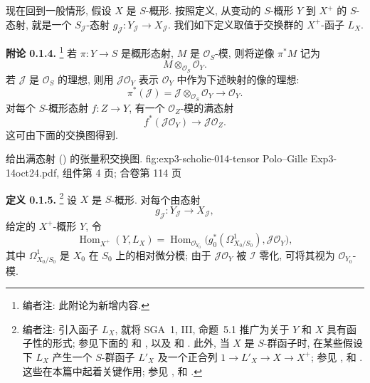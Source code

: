 现在回到一般情形, 假设 \(X\) 是 \(S\)-概形. 按照定义,
从变动的 \(S\)-概形 \(Y\) 到 \(X^+\) 的 \(S\)-态射,
就是一个 \(S_{\mathscr J}\)-态射
\(g_{\mathscr J}:Y_{\mathscr J}\to X_{\mathscr J}\).
我们如下定义取值于交换群的 \(X^+\)-函子 \(L_X\).

\medskip
\noindent{}\textbf{附论 0.1.4.}
\footnote{编者注: 此附论为新增内容.}
若 \(\pi:Y\to S\) 是概形态射, \(M\) 是 \(\mathscr O_S\)-模,
则将逆像 \(\pi^*M\) 记为
\[
 M\otimes_{\mathscr O_S}\mathscr O_Y.
\]
若 \(\mathscr J\) 是 \(\mathscr O_S\) 的理想, 则用
\(\mathscr J\mathscr O_Y\) 表示 \(\mathscr O_Y\) 中作为下述映射的像的理想:
\[
 \pi^*(\mathscr J)
 =\mathscr J\otimes_{\mathscr O_S}\mathscr O_Y
 \longrightarrow\mathscr O_Y.
\]
对每个 \(S\)-概形态射 \(f:Z\to Y\), 有一个
\(\mathscr O_Z\)-模的满态射
\begin{equation}
 f^*(\mathscr J\mathscr O_Y)\longrightarrow
 \mathscr J\mathscr O_Z.
 \tag{0.1.4}\label{sga3:iii:scholium:0-1-4:equation:0-1-4}
\end{equation}
这可由下面的交换图得到.

  {给出满态射 () 的张量积交换图.}
  {fig:exp3-scholie-014-tensor}
  {Polo--Gille Exp3-14oct24.pdf, 组件第 4 页; 合卷第 114 页}

\medskip
\noindent{}\textbf{定义 0.1.5.}
\footnote{编者注: 引入函子 \(L_X\), 就将 SGA~1, III, 命题~5.1
推广为关于 \(Y\) 和 \(X\) 具有函子性的形式; 参见下面的
 和
, 以及
 和
. 此外, 当 \(X\)
是 \(S\)-群函子时, 在某些假设下 \(L_X\) 产生一个 \(S\)-群函子
\(L'_X\) 及一个正合列 \(1\to L'_X\to X\to X^+\);
参见 ,
 和
.
这些在本篇中起着关键作用; 参见
,
 和
.}
设 \(X\) 是 \(S\)-概形. 对每个由态射
\[
 g_{\mathscr J}:Y_{\mathscr J}\longrightarrow X_{\mathscr J},
\]
给定的 \(X^+\)-概形 \(Y\), 令
\[
 \operatorname{Hom}_{X^+}(Y,L_X)
 =
 \operatorname{Hom}_{\mathscr O_{Y_0}}
 \bigl(g_0^*(\Omega^1_{X_0/S_0}),\mathscr J\mathscr O_Y\bigr),
\]
其中 \(\Omega^1_{X_0/S_0}\) 是 \(X_0\) 在 \(S_0\) 上的相对微分模;
由于 \(\mathscr J\mathscr O_Y\) 被 \(\mathscr I\) 零化,
可将其视为 \(\mathscr O_{Y_0}\)-模.


